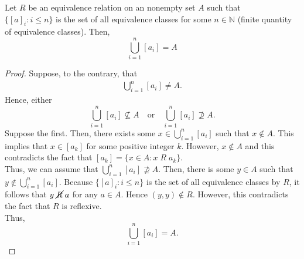 \documentclass[12pt]{article}
\newcommand{\N}{\mathbb{N}}
\newenvironment{lemma}[2][Lemma]{\begin{trivlist}
		\item[\hskip \labelsep {\bfseries #1}\hskip \labelsep {\bfseries #2.}]}{\end{trivlist}}
\begin{document}
	\begin{lemma}{8.3.2}
		Let $R$ be an equivalence relation on an nonempty set $A$ such that \\$\{[a]_{i}:i\leq n\}$ is the set of all equivalence classes for some $n\in \N$ (finite quantity of equivalence classes). Then, 
		\begin{equation*}
			\bigcup_{i=1}^{n} [a_{i}] = A
		\end{equation*}
		\begin{proof}
			Suppose, to the contrary, that 
			\begin{align*}
				\bigcup_{i=1}^{n} [a_{i}] \neq A.
			\end{align*}
		Hence, either 
		\begin{equation*}
			\bigcup_{i=1}^{n} [a_{i}] \not\subseteq A \quad \text{or} \quad \bigcup_{i=1}^{n} [a_{i}] \not\supseteq A.
		\end{equation*}
	 Suppose the first. Then, there exists some $x\in \bigcup_{i=1}^{n} [a_{i}]$ such that $x\not\in A$. This implies that $x\in [a_{k}]$ for some positive integer $k$. However, $x\not\in A$ and this contradicts the fact that $[a_{k}] = \{x\in A: x\; R \;a_{k}\}$. \\
	 
	 Thus, we can assume that $\bigcup_{i=1}^{n} [a_{i}] \not\supseteq A$. Then, there is some $y\in A$ such that $y\not\in \bigcup_{i=1}^{n} [a_{i}]$. Because $\{[a]_{i}:i\leq n\}$ is the set of all equivalence classes by $R$, it follows that $y \; \cancel R \; a$ for any $a\in A$. Hence $(y,y) \not\in R$. However, this contradicts the fact that $R$ is reflexive.\\
	 
	 Thus, 
	 \begin{equation*}
	 	\bigcup_{i=1}^{n} [a_{i}] = A.
	 \end{equation*} 
		\end{proof}
	\end{lemma}
\end{document}
